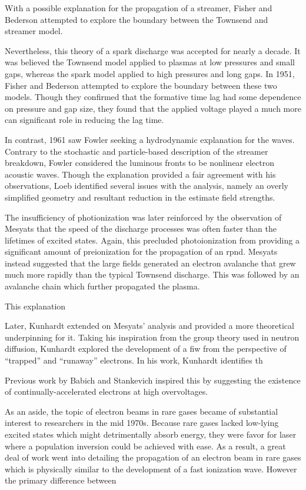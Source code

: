 With a possible explanation for the propagation of a streamer, Fisher and Bederson
attempted to explore the boundary between the Townsend and streamer model. 

Nevertheless, this theory of a spark discharge was accepted for nearly a decade.
It was believed the Townsend model applied to plasmas at low pressures and small
gaps, whereas the spark model applied to high pressures and long gaps. In 1951,
Fisher and Bederson attempted to explore the boundary between these two models.
Though they confirmed that the formative time lag had some dependence on
pressure and gap size, they found that the applied voltage played a much more
 can significant role in reducing the lag time.

In contrast, 1961 saw Fowler \cite{Fowler1961} seeking a hydrodynamic
explanation for the waves. Contrary to the stochastic and particle-based
description of the streamer breakdown, Fowler considered the luminous fronts to
be nonlinear electron acoustic waves. Though the explanation provided a fair
agreement with his observations, Loeb \cite{Loeb1965} identified several
issues with the analysis, namely an overly simplified geometry and resultant
reduction in the estimate field strengths.

The insufficiency of photionization was later reinforced by the observation of
Mesyats \cite{Mesyats1972} that the speed of the discharge processes was often
faster than the lifetimes of excited states. Again, this precluded
photoionization from providing a significant amount of preionization for the
propagation of an rpnd. Mesyats instead suggested that the large fields
generated an electron avalanche that grew much more rapidly than the typical
Townsend discharge. This was followed by an avalanche chain which further
propagated the plasma.

This explanation 

Later, Kunhardt \cite{Kunhardt1980} extended on Mesyats' analysis and provided a
more theoretical underpinning for it. Taking his inspiration from the group
theory used in neutron diffusion, Kunhardt explored the development of a fiw
from the perspective of ``trapped'' and ``runaway'' electrons. In his
work, Kunhardt identifies th

Previous work by
Babich and Stankevich \cite{Babich1973} inspired this by suggesting the
existence of continually-accelerated electrons at high overvoltages.

As an aside, the topic of electron beams in rare gases became of substantial
interest to researchers in the mid 1970s. Because rare gases lacked low-lying
excited states which might detrimentally absorb energy, they were favor for
laser where a population inversion could be achieved with ease. As a result, a
great deal of work went into detailing the propagation of an electron beam in
rare gases which is physically similar to the development of a fast ionization
wave. However the primary difference between

